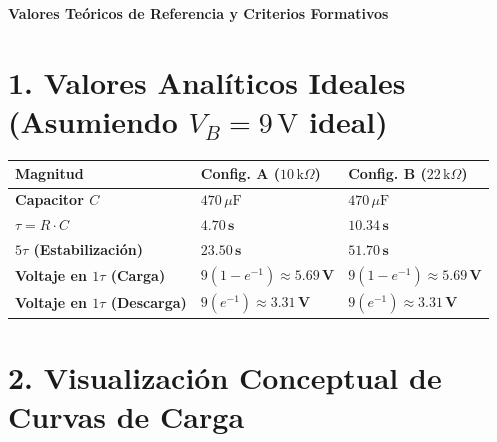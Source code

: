 \documentclass[11pt, a4paper]{article}
\begin{document}
\begin{tcolorbox}[colback=ucbblue!5!white, colframe=ucbblue, title=\textbf{Clave Docente: Laboratorio RC}]
    \centering \textbf{Valores Teóricos de Referencia y Criterios Formativos}
\end{tcolorbox}

\section*{1. Valores Analíticos Ideales (Asumiendo $V_B = 9\,\text{V}$ ideal)}

\renewcommand{\arraystretch}{1.5}
\noindent
\begin{tabularx}{\textwidth}{>{\bfseries}p{3cm} >{\centering\arraybackslash}X >{\centering\arraybackslash}X}
\toprule
\textbf{Magnitud} & \textbf{Config. A ($10\,\text{k}\Omega$)} & \textbf{Config. B ($22\,\text{k}\Omega$)} \\ 
\midrule
Capacitor $C$ & $470\,\mu\text{F}$ & $470\,\mu\text{F}$ \\ \addlinespace
$\tau = R \cdot C$ & $\mathbf{4.70\,\text{s}}$ & $\mathbf{10.34\,\text{s}}$ \\ \addlinespace
$5\tau$ (Estabilización) & $\mathbf{23.50\,\text{s}}$ & $\mathbf{51.70\,\text{s}}$ \\ \addlinespace
Voltaje en $1\tau$ (Carga) & $9(1-e^{-1}) \approx \mathbf{5.69\,\text{V}}$ & $9(1-e^{-1}) \approx \mathbf{5.69\,\text{V}}$ \\ \addlinespace
Voltaje en $1\tau$ (Descarga) & $9(e^{-1}) \approx \mathbf{3.31\,\text{V}}$ & $9(e^{-1}) \approx \mathbf{3.31\,\text{V}}$ \\ 
\bottomrule
\end{tabularx}

\section*{2. Visualización Conceptual de Curvas de Carga}
\begin{center}
\end{center}
\end{document}
